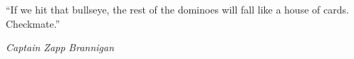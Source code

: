 
\clearpage

\null\vfill


\vspace*{4mm}

\enquote{If we hit that bullseye, the rest of the dominoes will fall like a house of cards. Checkmate.}
\begin{flushright} \emph{Captain Zapp Brannigan} \end{flushright}

\vfill\vfill


